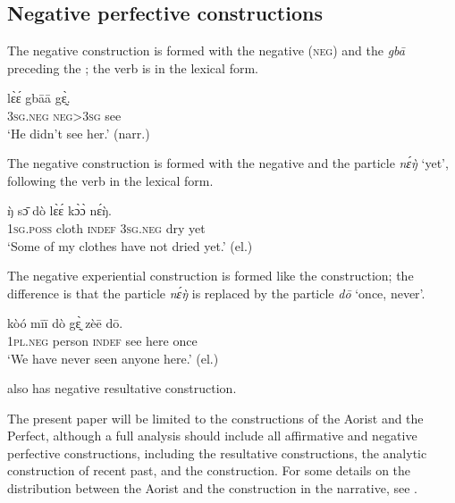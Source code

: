 \documentclass[output=paper,newtxmath,modfonts,nonflat,hidelinks]{langsci/langscibook}
\begin{document}
\subsection{Negative perfective constructions}
\label{khachsecneg}
The negative  construction is formed with the negative  (\textsc{neg}) and the  \textit{gbā} preceding the ; the verb is in the lexical form.

\begin{exe} \ex
\gll lɛ̀ɛ́	gbāā	gɛ̰̀.\\
	3\textsc{sg}.\textsc{neg}	\textsc{neg}>3\textsc{sg}	see\\
\glt ‘He didn’t see her.’ (narr.)
\end{exe} 

The negative  construction is formed with the negative  and the particle \textit{nɛ́ŋ̀} ‘yet’, following the verb in the lexical form.

\begin{exe}\ex
\gll ŋ̀	sɔ̄	dò	lɛ̀ɛ́	kɔ̀ɔ̀	nɛ́ŋ̀.	\\
	1\textsc{sg}.\textsc{poss}	cloth	\textsc{indef}	3\textsc{sg}.\textsc{neg}	dry	yet	\\
\glt ‘Some of my clothes have not dried yet.’ (el.)
\end{exe}

The negative experiential construction is formed like the  construction; the difference is that the particle \textit{nɛ́ŋ̀} is replaced by the particle \textit{dō} ‘once, never’.

\begin{exe} \ex
\gll 	kòó	mīī	dò	gɛ̰̀	zèē	dō.	\\
	1\textsc{pl}.\textsc{neg}	person	\textsc{indef}	see	here	once	\\
\glt ‘We have never seen anyone here.’ (el.)
\end{exe}

 also has negative resultative construction.

The present paper will be limited to the constructions of the Aorist and the Perfect, although a full analysis should include all affirmative and negative perfective constructions, including the resultative constructions, the analytic construction of recent past, and the  construction. For some details on the distribution between the Aorist and the  construction in the narrative, see .
 
\end{document}
